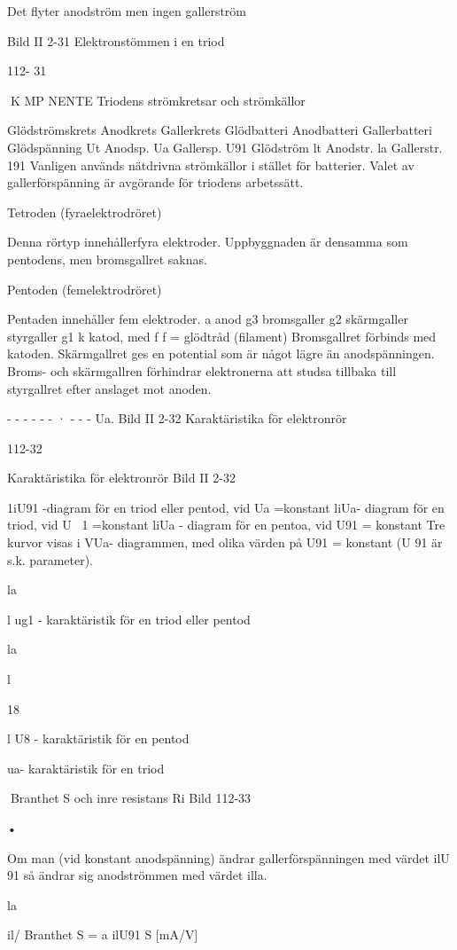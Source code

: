 \documentclass[a4paper,twoside,twocolumn,openright]{book}
\begin{document}
{{{{Det flyter anodström men ingen gallerström

Bild II 2-31 Elektronstömmen i en triod

112- 31

K MP NENTE
Triodens strömkretsar och strömkällor

Glödströmskrets Anodkrets Gallerkrets
Glödbatteri
Anodbatteri Gallerbatteri
Glödspänning Ut Anodsp. Ua Gallersp. U91
Glödström lt
Anodstr. la Gallerstr. 191
Vanligen används nätdrivna strömkällor i
stället för batterier.
Valet av gallerförspänning är avgörande för
triodens arbetssätt.

Tetroden (fyraelektrodröret)

Denna rörtyp innehållerfyra elektroder. Uppbyggnaden är densamma som pentodens,
men bromsgallret saknas.

Pentoden (femelektrodröret)

Pentaden innehåller fem elektroder.
a
anod
g3
bromsgaller
g2
skärmgaller
styrgaller
g1
k
katod, med f f = glödtråd (filament)
Bromsgallret förbinds med katoden. Skärmgallret ges en potential som är något lägre än
anodspänningen. Broms- och skärmgallren
förhindrar elektronerna att studsa tillbaka till
styrgallret efter anslaget mot anoden.

- - - - - - · - - - Ua.
Bild II 2-32 Karaktäristika för elektronrör

112-32

Karaktäristika för elektronrör
Bild II 2-32

1iU91 -diagram för en triod eller pentod, vid Ua
=konstant
liUa- diagram för en triod, vid U~ 1 =konstant
liUa - diagram för en pentoa, vid U91 =
konstant
Tre kurvor visas i VUa- diagrammen, med
olika värden på U91 = konstant (U 91 är s.k.
parameter).

la

l ug1 - karaktäristik för en triod eller pentod

la

l

18

l U8 - karaktäristik för en pentod

ua- karaktäristik för en triod

Branthet S och inre resistans Ri
Bild 112-33

•

Om man (vid konstant anodspänning)
ändrar gallerförspänningen med värdet
ilU 91 så ändrar sig anodströmmen med
värdet illa.

la

il/
Branthet S = a
ilU91
S [mA/V]

}}}}
\end{document}
